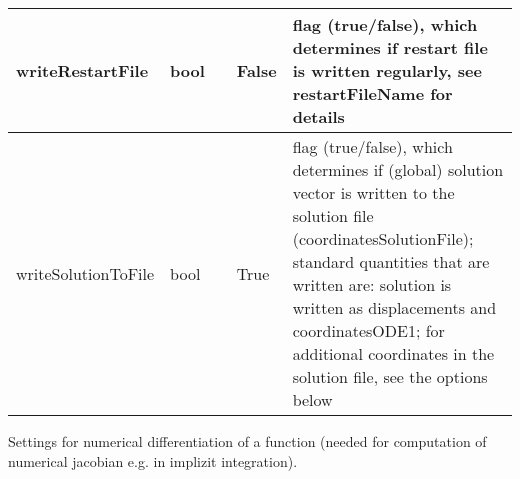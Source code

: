 \begin{center}
\begin{longtable}{| p{4.2cm} | p{2.5cm} | p{0.3cm} | p{3.0cm} | p{6cm} |}
    writeRestartFile &     bool &      &     False &     flag (true/false), which determines if restart file is written regularly, see restartFileName for details\\ \hline
    writeSolutionToFile &     bool &      &     True &     flag (true/false), which determines if (global) solution vector is written to the solution file (coordinatesSolutionFile); standard quantities that are written are: solution is written as displacements and coordinatesODE1; for additional coordinates in the solution file, see the options below\\ \hline
	  \end{longtable}
	\end{center}



\label{sec:NumericalDifferentiationSettings}
Settings for numerical differentiation of a function (needed for computation of numerical jacobian e.g. in implizit integration).

